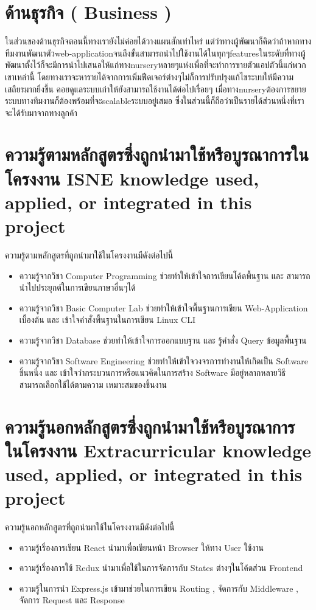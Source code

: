 \section{ ด้านธุรกิจ ( Business )
}
ในส่วนของด้านธุรกิจตอนนี้ทางเรายังไม่ค่อยได้วางแผนสักเท่าไหร่ แต่ว่าทางผู้พัฒนาก็คิดว่าถ้าหากทางทีมงานพัฒนาตัวweb-applicationจนถึงขั้นสามารถนำไปใช้งานได้ในทุกๆfeaturesในระดับที่ทางผู้พัฒนาตั้งไว้ก็จะมีการนำไปเสนอให้แก่ทางnurseryหลายๆแห่งเพื่อที่จะทำการขายตัวแอปตัวนี้แก่พวกเขาเหล่านี้ โดยทางเราจะหารายได้จากการเพิ่มฟีดเจอร์ต่างๆไม่ก็การปรับปรุงแก้ไขระบบให้มีความเสถียรมากยิ่งขึ้น คอยดูแลระบบเก่าให้ยังสามารถใช้งานได้ต่อไปเรื่อยๆ 	เมื่อทางnurseryต้องการขยายระบบทางทีมงานก็ต้องพร้อมที่จะscalableระบบอยู่เสมอ ซึ่งในส่วนนี้ก็ถือว่าเป็นรายได้ส่วนหนึ่งที่เราจะได้รับมาจากทางลูกค้า


\section{\ifcpe%
ความรู้ตามหลักสูตรซึ่งถูกนำมาใช้หรือบูรณาการในโครงงาน
\else%
ISNE knowledge used, applied, or integrated in this project
\fi
}

ความรู้ตามหลักสูตรที่ถูกนำมาใช้ในโครงงานมีดังต่อไปนี้
\begin{itemize}
  \item ความรู้จากวิชา Computer Programming ช่วยทำให้เข้าใจการเขียนโค้ดพื้นฐาน และ สามารถนำไปประยุกต์ในการเขียนภาษาอื่นๆได้
  \item ความรู้จากวิชา Basic Computer Lab ช่วยทำให้เข้าใจพื้นฐานการเขียน Web-Application เบื้องต้น และ เข้าใจคำสั่งพื้นฐานในการเขียน Linux CLI
  \item ความรู้จากวิชา Database ช่วยทำให้เข้าใจการออกแบบฐาน และ รู้คำสั่ง Query ข้อมูลพื้นฐาน
  \item ความรู้จากวิชา Software Engineering ช่วยทำให้เข้าใจวงจรการทำงานให้เกิดเป็น Software ชิ้นหนึ่ง และ เข้าใจว่ากระบวนการหรือแนวคิดในการสร้าง Software มีอยู่หลากหลายวิธี สามารถเลือกใช้ได้ตามความ
  เหมาะสมของชิ้นงาน 
  
\end{itemize}


\section{\ifcpe%
ความรู้นอกหลักสูตรซึ่งถูกนำมาใช้หรือบูรณาการในโครงงาน
\else%
Extracurricular knowledge used, applied, or integrated in this project
\fi
}

ความรู้นอกหลักสูตรที่ถูกนำมาใช้ในโครงงานมีดังต่อไปนี้
\begin{itemize}
  \item ความรู้เรื่องการเขียน React นำมาเพื่อเขียนหน้า Browser ให้ทาง User ใช้งาน
  \item ความรู้เรื่องการใช้ Redux นำมาเพื่อใช้ในการจัดการกับ States ต่างๆในโค้ดส่วน Frontend
  \item ความรู้ในการนำ Express.js เข้ามาช่วยในการเขียน Routing , จัดการกับ Middleware , จัดการ Request และ Response
\end{itemize}
